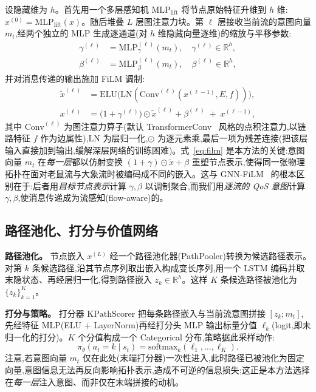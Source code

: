 设隐藏维为 $h$。首先用一个多层感知机 $\mathrm{MLP}_{\text{lift}}$ 将节点原始特征升维到 $h$ 维:$x^{(0)}=\mathrm{MLP}_{\text{lift}}(x)$。随后堆叠 $L$ 层图注意力块。第 $\ell$ 层接收当前流的意图向量 $m_t$,经两个独立的 MLP 生成逐通道(对 $h$ 维隐藏向量逐维)的缩放与平移参数:
\begin{align}
\gamma^{(\ell)} &= \mathrm{MLP}^{(\ell)}_{\gamma}(m_t), \quad \gamma^{(\ell)}\in\mathbb{R}^{h},
\label{eq:film_gamma}\\
\beta^{(\ell)} &= \mathrm{MLP}^{(\ell)}_{\beta}(m_t), \quad \beta^{(\ell)}\in\mathbb{R}^{h},
\label{eq:film_beta}
\end{align}
并对消息传递的输出施加 FiLM 调制:
\begin{align}
\tilde x^{(\ell)} &= \mathrm{ELU}\!\big(\mathrm{LN}(\mathrm{Conv}^{(\ell)}(x^{(\ell-1)}, E, f))\big),
\label{eq:conv}\\
x^{(\ell)} &= \big(1+\gamma^{(\ell)}\big)\odot \tilde x^{(\ell)} + \beta^{(\ell)} \;+\; x^{(\ell-1)},
\label{eq:film}
\end{align}
其中 $\mathrm{Conv}^{(\ell)}$ 为图注意力算子(默认 TransformerConv~\cite{Shi2021_UniMP} 风格的点积注意力,以链路特征 $f$ 作为边属性),$\mathrm{LN}$ 为层归一化,$\odot$ 为逐元素乘,最后一项为残差连接(把该层输入直接加到输出,缓解深层网络的训练困难)。式~\eqref{eq:film} 是本方法的关键:意图向量 $m_t$ 在\emph{每一层}都以仿射变换 $(1+\gamma)\odot\tilde x+\beta$ 重塑节点表示,使得同一张物理拓扑在面对老鼠流与大象流时被编码成不同的嵌入。这与 GNN-FiLM~\cite{Brockschmidt2020_GNNFiLM} 的根本区别在于:后者用\emph{目标节点表示}计算 $\gamma,\beta$ 以调制聚合,而我们用\emph{逐流的 QoS 意图}计算 $\gamma,\beta$,使消息传递成为流感知(flow-aware)的。

\subsection{路径池化、打分与价值网络}
\label{sec:method:scorer}

\textbf{路径池化。} 节点嵌入 $x^{(L)}$ 经一个路径池化器(PathPooler)转换为候选路径表示。对第 $k$ 条候选路径,沿其节点序列取出嵌入构成变长序列,用一个 LSTM 编码并取末隐状态、再经层归一化,得到路径嵌入 $z_k\in\mathbb{R}^{h}$。这样 $K$ 条候选路径被池化为 $\{z_k\}_{k=1}^{K}$。

\textbf{打分与策略。} 打分器 $\mathrm{KPathScorer}$ 把每条路径嵌入与当前流意图拼接 $[z_k; m_t]$,先经特征 MLP(ELU $+$ LayerNorm)再经打分头 MLP 输出标量分值 $\ell_k$(logit,即未归一化的打分)。$K$ 个分值构成一个 Categorical 分布,策略据此采样动作:
\begin{equation}
\pi_\theta(a_t\!=\!k\mid s_t) = \mathrm{softmax}_k(\ell_1,\dots,\ell_K).
\label{eq:policy}
\end{equation}
注意,若意图向量 $m_t$ 仅在此处(末端打分器)一次性进入,此时路径已被池化为固定向量,意图信息无法再反向影响拓扑表示,造成不可逆的信息损失;这正是本方法选择在\emph{每一层}注入意图、而非仅在末端拼接的动机。

